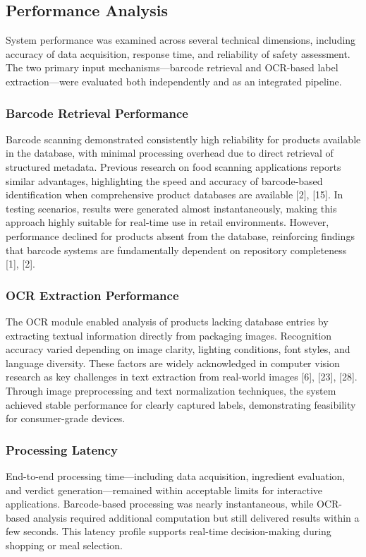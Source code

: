 \documentclass[conference]{IEEEtran}
\begin{document}
\subsection{Performance Analysis}

System performance was examined across several technical dimensions, including accuracy of data acquisition, response time, and reliability of safety assessment. The two primary input mechanisms—barcode retrieval and OCR-based label extraction—were evaluated both independently and as an integrated pipeline.

\subsubsection{Barcode Retrieval Performance}
Barcode scanning demonstrated consistently high reliability for products available in the database, with minimal processing overhead due to direct retrieval of structured metadata. Previous research on food scanning applications reports similar advantages, highlighting the speed and accuracy of barcode-based identification when comprehensive product databases are available [2], [15]. In testing scenarios, results were generated almost instantaneously, making this approach highly suitable for real-time use in retail environments. However, performance declined for products absent from the database, reinforcing findings that barcode systems are fundamentally dependent on repository completeness [1], [2].

\subsubsection{OCR Extraction Performance}
The OCR module enabled analysis of products lacking database entries by extracting textual information directly from packaging images. Recognition accuracy varied depending on image clarity, lighting conditions, font styles, and language diversity. These factors are widely acknowledged in computer vision research as key challenges in text extraction from real-world images [6], [23], [28]. Through image preprocessing and text normalization techniques, the system achieved stable performance for clearly captured labels, demonstrating feasibility for consumer-grade devices.

\subsubsection{Processing Latency}
End-to-end processing time—including data acquisition, ingredient evaluation, and verdict generation—remained within acceptable limits for interactive applications. Barcode-based processing was nearly instantaneous, while OCR-based analysis required additional computation but still delivered results within a few seconds. This latency profile supports real-time decision-making during shopping or meal selection.
\end{document}
